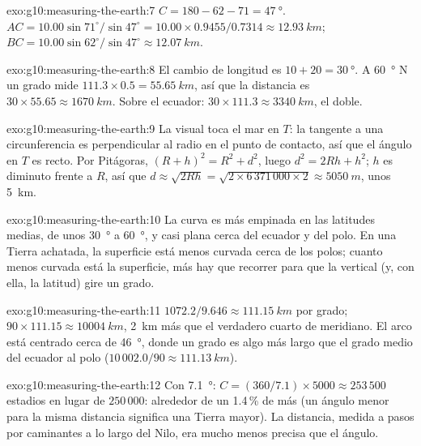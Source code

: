 \begin{solution}{exo:g10:measuring-the-earth:7}
$C = 180 - 62 - 71 = \qty{47}{\degree}$.
$AC = 10.00 \sin 71^\circ/\sin 47^\circ = 10.00 \times 0.9455/0.7314 \approx
\qty{12.93}{km}$; $BC = 10.00 \sin 62^\circ/\sin 47^\circ \approx
\qty{12.07}{km}$.
\end{solution}

\begin{solution}{exo:g10:measuring-the-earth:8}
El cambio de longitud es $10 + 20 = \qty{30}{\degree}$. A
\qty{60}{\degree} N un grado mide $111.3 \times 0.5 = \qty{55.65}{km}$, así que
la distancia es $30 \times 55.65 \approx \qty{1670}{km}$. Sobre el ecuador:
$30 \times 111.3 \approx \qty{3340}{km}$, el doble.
\end{solution}

\begin{solution}{exo:g10:measuring-the-earth:9}
La visual toca el mar en $T$: la tangente a una circunferencia es
perpendicular al radio en el punto de contacto, así que el ángulo en $T$ es
recto. Por Pitágoras, $(R+h)^2 = R^2 + d^2$, luego $d^2 = 2Rh + h^2$; $h$ es
diminuto frente a $R$, así que $d \approx \sqrt{2Rh} = \sqrt{2 \times
6\,371\,000 \times 2} \approx \qty{5050}{m}$, unos \qty{5}{km}.
\end{solution}

\begin{solution}{exo:g10:measuring-the-earth:10}
La curva es más empinada en las latitudes medias, de unos \qty{30}{\degree} a
\qty{60}{\degree}, y casi plana cerca del ecuador y del polo. En una Tierra
achatada, la superficie está menos curvada cerca de los polos; cuanto menos
curvada está la superficie, más hay que recorrer para que la vertical (y, con
ella, la latitud) gire un grado.
\end{solution}

\begin{solution}{exo:g10:measuring-the-earth:11}
$1072.2/9.646 \approx \qty{111.15}{km}$ por grado; $90 \times 111.15
\approx \qty{10004}{km}$, \qty{2}{km} más que el verdadero cuarto de
meridiano. El arco está centrado cerca de \qty{46}{\degree}, donde un grado
es algo más largo que el grado medio del ecuador al polo
($10\,002.0/90 \approx \qty{111.13}{km}$).
\end{solution}

\begin{solution}{exo:g10:measuring-the-earth:12}
Con \qty{7.1}{\degree}: $C = (360/7.1) \times 5000 \approx 253\,500$ estadios
en lugar de $250\,000$: alrededor de un 1.4\,\% de más (un ángulo menor para
la misma distancia significa una Tierra mayor). La distancia, medida a pasos
por caminantes a lo largo del Nilo, era mucho menos precisa que el ángulo.
\end{solution}

